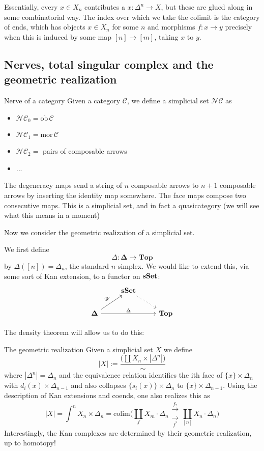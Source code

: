 Essentially, every $x\in X_n$ contributes a $x:\Delta^n\rightarrow X$, but these are glued along in some combinatorial way. The index over which we take the colimit is the category of ends, which has objects $x\in X_n$ for some $n$ and morphisms $f:x\rightarrow y$ precisely when this is induced by some map $[n]\rightarrow [m]$, taking $x$ to $y$. 

\subsection{Nerves, total singular complex and the geometric realization}

\begin{example}{Nerve of a category}{}
    Given a category $\mathcal{C}$, we define a simplicial set $\mathcal{N}\mathcal{C}$ as 
    \begin{itemize}
        \item $\mathcal{NC}_0=\mathrm{ob} \, \mathcal{C}$
        \item $\mathcal{NC}_1=\mathrm{mor}\,\mathcal{C}$
        \item  $\mathcal{NC}_2=$ pairs of composable arrows
        \item ...
    \end{itemize}
    The degeneracy maps send a string of $n$ composable arrows to $n+1$ composable arrows by inserting the identity map somewhere. The face maps compose two consecutive maps. This is a simplicial set, and in fact a quasicategory (we will see what this means in a moment)
\end{example}

Now we consider the geometric realization of a simplicial set.

We first define $$\Delta: \mathbf{\Delta}\rightarrow \mathbf{Top}$$by $\Delta([n])=\Delta_n$, the standard $n$-simplex.  We would like to extend this, via some sort of Kan extension, to a functor on $\operatorname{\mathbf{sSet}}$: \[\begin{tikzcd}
    & \sSet \arrow[rd, dotted] &              \\
\mathbf{\Delta} \arrow[ru, "\mathscr{Y}"] \arrow[rr, "\Delta"] &                          & \mathbf{Top}
\end{tikzcd}\]

The density theorem will allow us to do this:

\begin{example}{The geometric realization}{}
    Given a simplicial set $X$ we define $$|X|:= \frac{\bigg(\coprod X_n\times |\Delta^n|\bigg)}{\sim}$$where $|\Delta^n|=\Delta_n$ and the equivalence relation identifies the ith face of $\{x\}\times \Delta_n$ with $d_i(x)\times \Delta_{n-1}$ and also collapses $\{s_i(x)\}\times \Delta_n$ to $\{x\}\times \Delta_{n-1}$. Using the description of Kan extensions and coends, one also realizes this as $$|X|=\int^nX_n\times \Delta_n=\mathrm{colim}\bigg(\coprod_{f}X_m\cdot \Delta_n 
    \substack{\xrightarrow{f_*}\\[-0.9em] \xrightarrow[f^*]{}} \coprod_{[n]} X_n\cdot \Delta_n\bigg)
    $$
    Interestingly, the Kan complexes are determined by their geometric realization, up to homotopy!
    
    \end{example}


